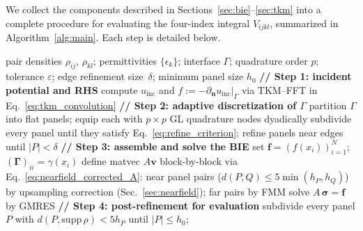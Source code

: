 \documentclass[preprint,12pt]{elsarticle}
\newcommand{\V}[1]{\boldsymbol{#1}}
\newcommand{\M}[1]{\boldsymbol{#1}}
\newcommand{\abs}[1]{\left|#1\right|}
\begin{document}
We collect the components described in Sections~\ref{sec:bie}--\ref{sec:tkm} into a
complete procedure for evaluating the four-index integral $V_{ijkl}$, summarized in
Algorithm~\ref{alg:main}.
Each step is detailed below.

\begin{algorithm}[H]
\footnotesize
\algrenewcommand\algorithmicindent{1.2em}
\algrenewcommand{}
\caption{Adaptive BIE solver for the four-index integral $V_{ijkl}$.}
\label{alg:main}
    \begin{algorithmic}[1]
        \Require pair densities $\rho_{ij}$, $\rho_{kl}$; permittivities $\{\epsilon_k\}$;
                interface $\Gamma$; quadrature order $p$; tolerance $\varepsilon$; edge refinement size~$\delta$;  minimum panel size $h_0$
        \State \textbf{// Step 1: incident potential and RHS} 
        \State compute $u_{\mathrm{inc}}$ and $f := -\partial_{\V{n}}u_{\mathrm{inc}}|_{\Gamma}$ via TKM--FFT in Eq.~\eqref{eq:tkm_convolution}
        \State \textbf{// Step 2: adaptive discretization of $\Gamma$} 
        \State partition $\Gamma$ into flat panels; equip each with $p{\times}p$ GL quadrature nodes
        \State dyadically subdivide every panel until they satisfy Eq.~\eqref{eq:refine_criterion}; refine panels near edges until $\abs{P} < \delta$
        \State \textbf{// Step 3: assemble and solve the BIE}
        \State set $\mathbf{f} = (f(x_i))_{i=1}^{N}$;\quad
            $(\M{\Gamma})_{ii} = \gamma(x_i)$
        \State define matvec $A\mathbf{v}$ block-by-block via Eq.~\eqref{eq:nearfield_corrected_A}: near panel pairs
            ($d(P,Q)\leq 5\min(h_P,h_Q)$) by upsampling correction (Sec.~\ref{sec:nearfield}); far pairs by FMM
        \State solve $A\,\boldsymbol{\sigma} = \mathbf{f}$ by GMRES
        \State \textbf{// Step 4: post-refinement for evaluation}
        \State subdivide every panel $P$ with $d(P,\mathrm{supp}\,\rho) < 5h_P$
               until $\abs{P} \leq h_0$;

\end{algorithmic}
\end{algorithm}
\end{document}
